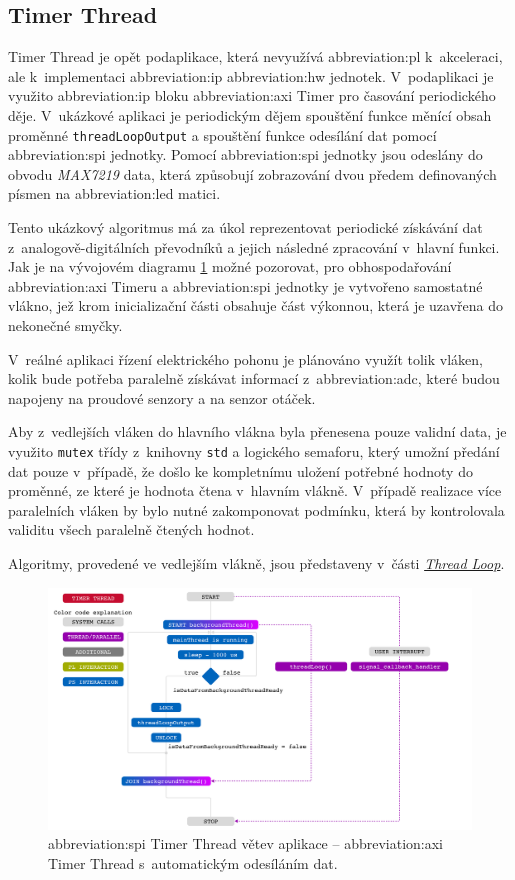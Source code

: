 \documentclass[a4paper, twoside, 11pt]{article}
\begin{document}
	\subsection{Timer Thread}
	Timer Thread je opět podaplikace, která nevyužívá \gls{abbreviation:pl} k~akceleraci, ale k~implementaci \gls{abbreviation:ip} \gls{abbreviation:hw} jednotek. V~podaplikaci je využito \gls{abbreviation:ip} bloku \gls{abbreviation:axi} Timer pro časování periodického děje. V~ukázkové aplikaci je periodickým dějem spouštění funkce měnící obsah proměnné \texttt{threadLoopOutput} a spouštění funkce odesílání dat pomocí \gls{abbreviation:spi} jednotky. Pomocí \gls{abbreviation:spi} jednotky jsou odeslány do obvodu \textit{MAX7219} data, která způsobují zobrazování dvou předem definovaných písmen na \gls{abbreviation:led} matici.\par
	Tento ukázkový algoritmus má za úkol reprezentovat periodické získávání dat z~analogově-digitálních převodníků a jejich následné zpracování v~hlavní funkci. Jak je na vývojovém diagramu \ref{fig:timer-thread} možné pozorovat, pro obhospodařování \gls{abbreviation:axi} Timeru a \gls{abbreviation:spi} jednotky je vytvořeno samostatné vlákno, jež krom inicializační části obsahuje část výkonnou, která je uzavřena do nekonečné smyčky.\par
	V~reálné aplikaci řízení elektrického pohonu je plánováno využít tolik vláken, kolik bude potřeba paralelně získávat informací z~\gls{abbreviation:adc}, které budou napojeny na proudové senzory a na senzor otáček.\par
	Aby z~vedlejších vláken do hlavního vlákna byla přenesena pouze validní data, je využito \texttt{mutex} třídy z~knihovny \texttt{std} a logického semaforu, který umožní předání dat pouze v~případě, že došlo ke kompletnímu uložení potřebné hodnoty do proměnné, ze které je hodnota čtena v~hlavním vlákně. V~případě realizace více paralelních vláken by bylo nutné zakomponovat podmínku, která by kontrolovala validitu všech paralelně čtených hodnot.\par
	Algoritmy, provedené ve vedlejším vlákně, jsou představeny v~části \hyperref[subsubsec:thread-loop]{\textit{Thread Loop}}.
	\begin{figure}[htbp!]
	 	\centering
	 	\includegraphics[width=1\textwidth]{src/pdf/timer-thread.pdf}
		\caption{\gls{abbreviation:spi} Timer Thread větev aplikace – \gls{abbreviation:axi} Timer Thread s~automatickým odesíláním dat.}
	 \label{fig:timer-thread}
 \end{figure}
\end{document}

